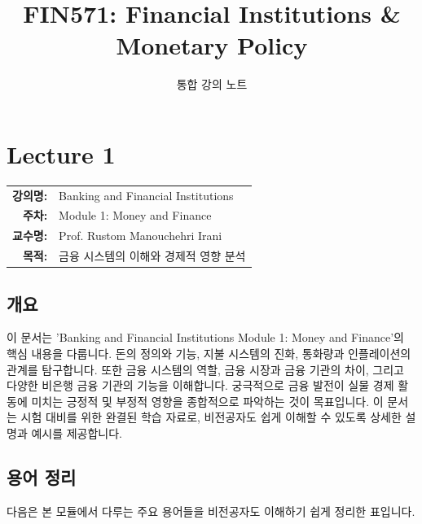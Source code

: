 \documentclass[11pt,a4paper]{book}
\title{\textbf{FIN571: Financial Institutions \& Monetary Policy}}
\author{통합 강의 노트}
\date{}
\makeatletter
\theoremstyle{definition}
\newcommand{\metainfo}[4]{
\begin{tcolorbox}[
    colback=lightpurple,
    colframe=darkpurple,
    boxrule=1pt,
    arc=2mm,
    left=10pt,
    right=10pt,
    top=8pt,
    bottom=8pt
]
\begin{tabular}{@{}rl@{}}
\textbf{강의명:} & #1 \\[0.3em]
\textbf{주차:} & #2 \\[0.3em]
\textbf{교수명:} & #3 \\[0.3em]
\textbf{목적:} & \begin{minipage}[t]{0.75\textwidth}#4\end{minipage}
\end{tabular}
\end{tcolorbox}
}
\makeatother
\begin{document}
\maketitle
\tableofcontents


\chapter{Lecture 1}
\label{ch:module1}

\metainfo{Banking and Financial Institutions}{Module 1: Money and Finance}{Prof. Rustom Manouchehri Irani}{금융 시스템의 이해와 경제적 영향 분석}


\section{개요}
이 문서는 'Banking and Financial Institutions Module 1: Money and Finance'의 핵심 내용을 다룹니다.
돈의 정의와 기능, 지불 시스템의 진화, 통화량과 인플레이션의 관계를 탐구합니다.
또한 금융 시스템의 역할, 금융 시장과 금융 기관의 차이, 그리고 다양한 비은행 금융 기관의 기능을 이해합니다.
궁극적으로 금융 발전이 실물 경제 활동에 미치는 긍정적 및 부정적 영향을 종합적으로 파악하는 것이 목표입니다.
이 문서는 시험 대비를 위한 완결된 학습 자료로, 비전공자도 쉽게 이해할 수 있도록 상세한 설명과 예시를 제공합니다.


\section{용어 정리}
다음은 본 모듈에서 다루는 주요 용어들을 비전공자도 이해하기 쉽게 정리한 표입니다.
\end{document}
